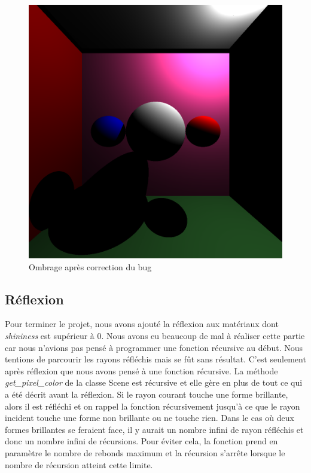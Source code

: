 \documentclass[11pt, oneside]{article}   	%
\begin{document}
\begin{figure}
    \centering
    \includegraphics[scale=0.2]{rapport/result 5.png}
    \caption{Ombrage après correction du bug}
    \label{fig:my_label}
\end{figure}

\subsection{Réflexion}
Pour terminer le projet, nous avons ajouté la réflexion aux matériaux dont \textit{shininess} est supérieur à 0. Nous avons eu beaucoup de mal à réaliser cette partie car nous n'avions pas pensé à programmer une fonction récursive au début. Nous tentions de parcourir les rayons réfléchis mais se fût sans résultat. C'est seulement après réflexion que nous avons pensé à une fonction récursive. La méthode \textit{get\_pixel\_color} de la classe Scene est récursive et elle gère en plus de tout ce qui a été décrit avant la réflexion. Si le rayon courant touche une forme brillante, alors il est réfléchi et on rappel la fonction récursivement jusqu'à ce que le rayon incident touche une forme non brillante ou ne touche rien. Dans le cas où deux formes brillantes se feraient face, il y aurait un nombre infini de rayon réfléchis et donc un nombre infini de récursions. Pour éviter cela, la fonction prend en paramètre le nombre de rebonds maximum et la récursion s'arrête lorsque le nombre de récursion atteint cette limite.
\end{document}
